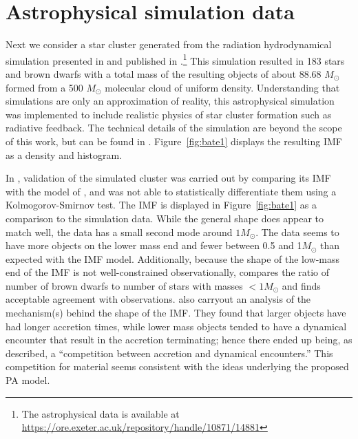 \documentclass[ejs]{imsart}
\numberwithin{equation}{section}
\theoremstyle{plain}
\newcommand{\Msun}{M_{\odot}}
\begin{document}
\section{Astrophysical simulation data} \label{sec:bate}

Next we consider a star cluster generated from the radiation hydrodynamical simulation presented in \cite{Bate2012} and published in \cite{Bate2014}.\footnote{The astrophysical data is available at \url{https://ore.exeter.ac.uk/repository/handle/10871/14881}}  
This simulation resulted in 183 stars and brown dwarfs with a total mass of the resulting objects of about 88.68 $\Msun$ formed from a 500 $\Msun$ molecular cloud of uniform density.  
Understanding that simulations are only an approximation of reality, this astrophysical simulation was implemented to include realistic physics of star cluster formation such as radiative feedback. 
The technical details of the simulation are beyond the scope of this work, but can be found in \cite{Bate2012}.
Figure~\ref{fig:bate1} displays the resulting IMF as a density and histogram.
%

In \cite{Bate2012}, validation of the simulated cluster was carried out by comparing its IMF with the model of \cite{chabrier2005}, and was not able to statistically differentiate them using a Kolmogorov-Smirnov test.  The \cite{chabrier2005} IMF is displayed in Figure~\ref{fig:bate1} as a comparison to the simulation data.  While the general shape does appear to match well, the \cite{Bate2012} data has a small second mode around $1\Msun$.  The \cite{Bate2012} data seems to have more objects on the lower mass end and fewer between 0.5 and 1$\Msun$ than expected with the \cite{chabrier2005} IMF model.
%
Additionally, because the shape of the low-mass end of the IMF is not well-constrained observationally,  \cite{Bate2012} compares the ratio of number of brown dwarfs to number of stars with masses $<1\Msun$ and finds acceptable agreement with observations. 
%
\cite{Bate2012} also carryout an analysis of the mechanism(s) behind the shape of the IMF.  
They found that larger objects have had longer accretion times, while lower mass objects tended to have a dynamical encounter that result in the accretion terminating; hence there ended up being, as \cite{Bate2012} described, a ``competition between accretion and dynamical encounters.''  This competition for material seems consistent with the ideas underlying the proposed PA model.
\end{document}
